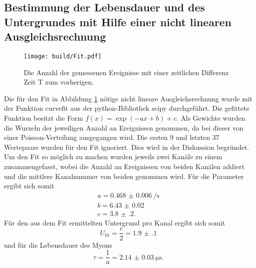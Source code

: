 \subsection{Bestimmung der Lebensdauer und des Untergrundes mit Hilfe einer nicht linearen Ausgleichsrechnung}
\label{subsec:Ausgleichs}
\begin{figure}
	\centering
	\texttt{[image: build/Fit.pdf]}
	\caption{Die Anzahl der gemessenen Ereignisse mit einer zeitlichen Differenz Zeit T zum vorherigen.}
	\label{fig:zweite}
\end{figure}
Die für den Fit in Abbildung \ref{fig:zweite} nötige nicht lineare Ausgleichsrechnung wurde mit der Funktion curvefit aus der python-Bibliothek scipy \cite{scipy} durchgeführt. Die gefittete Funktion besitzt die Form $f(x)=\exp(-a x +b)+c$. Als Gewichte wurden die Wurzeln der jeweiligen Anzahl an Ereignissen genommen, da bei dieser von einer Poisson-Verteilung ausgegangen wird. Die ersten $9$ und letzten $37$ Wertepaare wurden für den Fit ignoriert. Dies wird in der Diskussion begründet. Um den Fit so möglich zu machen wurden jeweils zwei Kanäle zu einem zusammengefasst, wobei die Anzahl an Ereignissen von beiden Kanälen addiert und die mittlere Kanalnummer von beiden genommen wird. %
Für die Parameter ergibt sich somit
\begin{gather*}
a=\SI{0.468(6)}{\per\second}\\
b=\num{6.43(2)}\\
c=\num{3.8(2)}.
\end{gather*}
Für den aus dem Fit ermittelten Untergrund pro Kanal ergibt sich somit
\begin{displaymath}
	U_\text{fit}=\frac{c}{2}=\num{1.9(1)}
\end{displaymath}
und für die Lebensdauer des Myons
\begin{displaymath}
	\tau=\frac{1}{a}=\SI{2.14(3)}{\micro\second}.
\end{displaymath}